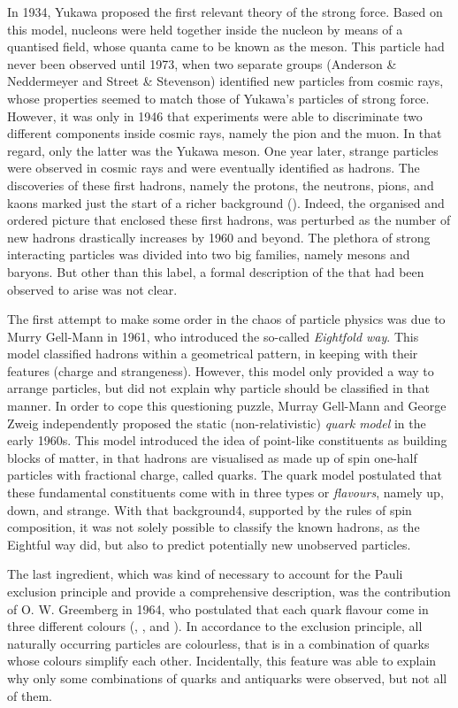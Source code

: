 In 1934, Yukawa proposed the first relevant theory of the strong force. Based on this model, nucleons were held together inside the nucleon by means of a quantised field, whose quanta came to be known as the meson. This particle had never been observed until 1973, when two separate groups (Anderson \& Neddermeyer and Street \& Stevenson) identified new particles from cosmic rays, whose properties seemed to match those of Yukawa's particles of strong force. However, it was only in 1946 that experiments were able to discriminate two different components inside cosmic rays, namely the pion and the muon. In that regard, only the latter was the Yukawa meson. One year later, strange particles were observed in cosmic rays and were eventually identified as hadrons. The discoveries of these first hadrons, namely the protons, the neutrons, pions, and kaons marked just the start of a richer background (). Indeed, the organised and ordered picture that enclosed these first hadrons, was perturbed as the number of new hadrons drastically increases by 1960 and beyond. The plethora of strong interacting particles was divided into two big families, namely mesons and baryons. But other than this label, a formal description of the  that had been observed to arise was not clear.%

The first attempt to make some order in the chaos of particle physics was due to Murry Gell-Mann in 1961, who introduced the so-called \textit{Eightfold way}. This model classified hadrons within a geometrical pattern, in keeping with their features (charge and strangeness). However, this model only provided a way to arrange particles, but did not explain why particle should be classified in that manner. In order to cope this questioning puzzle, Murray Gell-Mann and George Zweig independently proposed the static (non-relativistic) \textit{quark model} in the early 1960s. This model introduced the idea of point-like constituents as building blocks of matter, in that hadrons are visualised as made up of spin one-half particles with fractional charge, called quarks. The quark model postulated that these fundamental constituents come with in three types or \textit{flavours}, namely up, down, and strange. With that background4, supported by the rules of spin composition, it was not solely possible to classify the known hadrons, as the Eightful way did, but also to predict potentially new unobserved particles.%

The last ingredient, which was kind of necessary to account for the Pauli exclusion principle and provide a comprehensive description, was the contribution of O. W. Greemberg in 1964, who postulated that each quark flavour come in three different colours (, , and ). In accordance to the exclusion principle, all naturally occurring particles are colourless, that is in a combination of quarks whose colours simplify each other. Incidentally, this feature was able to explain why only some combinations of quarks and antiquarks were observed, but not all of them.%

